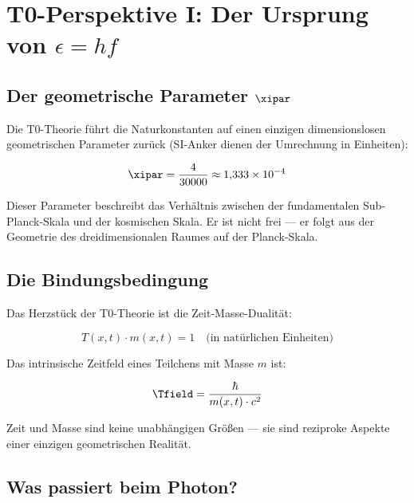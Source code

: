\clearpage

\section{T0-Perspektive I: Der Ursprung von $\epsilon = hf$}
\label{sec:t0_quantization}

\subsection{Der geometrische Parameter $\xipar$}

Die T0-Theorie führt die Naturkonstanten auf einen einzigen 
dimensionslosen geometrischen Parameter zurück (SI-Anker dienen der Umrechnung in Einheiten):

\begin{equation}
    \xipar = \frac{4}{30000} \approx 1{,}333 \times 10^{-4}
    \label{eq:xi_definition}
\end{equation}

Dieser Parameter beschreibt das Verhältnis zwischen der fundamentalen Sub-Planck-Skala 
und der kosmischen Skala. Er ist nicht frei — er folgt aus der Geometrie des 
dreidimensionalen Raumes auf der Planck-Skala.

\subsection{Die Bindungsbedingung}

Das Herzstück der T0-Theorie ist die Zeit-Masse-Dualität:

\begin{equation}
    T(x,t) \cdot m(x,t) = 1 \quad \text{(in natürlichen Einheiten)}
    \label{eq:t0_constraint}
\end{equation}

Das intrinsische Zeitfeld eines Teilchens mit Masse $m$ ist:

\begin{equation}
    \Tfield = \frac{\hbar}{m(x,t) \cdot c^2}
    \label{eq:timefield}
\end{equation}

Zeit und Masse sind keine unabhängigen Größen — sie sind reziproke Aspekte einer 
einzigen geometrischen Realität.

\subsection{Was passiert beim Photon?}

